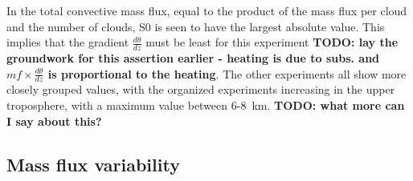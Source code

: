 \documentclass[11pt,a4paper]{article}
\newcommand\todo[1]{\textbf{TODO: #1}}
\begin{document}
In the total convective mass flux, equal to the product of the mass flux per cloud and the number of clouds, S0 is seen to have the largest absolute value. This implies that the gradient $\frac{d \theta}{dz}$ must be least for this experiment \todo{lay the groundwork for this assertion earlier - heating is due to subs. and $mf \times \frac{d \theta}{dz}$ is proportional to the heating}. The other experiments all show more closely grouped values, with the organized experiments increasing in the upper troposphere, with a maximum value between \SI{6}{}-\SI{8}{km}. \todo{what more can I say about this?}

\subsection{Mass flux variability}


%
\end{document}
